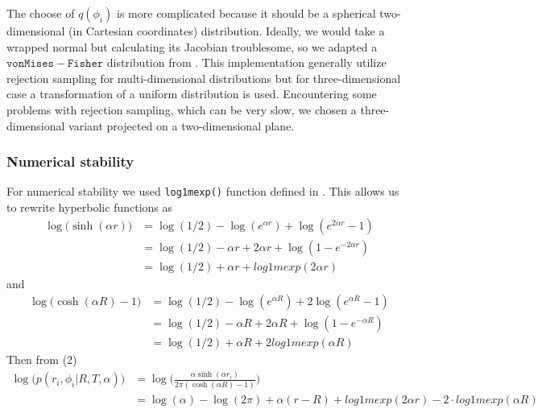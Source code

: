 \documentclass{article}
\begin{document}
The choose of $q(\phi_i)$ is more complicated because it should be a spherical two-dimensional (in Cartesian coordinates) distribution. Ideally, we would take a wrapped normal but calculating its Jacobian troublesome, so we adapted a $\mathtt{von Mises-Fisher}$ distribution from \cite{vmf}. This implementation generally utilize rejection sampling for multi-dimensional distributions but for three-dimensional case a transformation of a uniform distribution is used. Encountering some problems with rejection sampling, which can be very slow, we chosen a three-dimensional variant projected on a two-dimensional plane.\\

\subsubsection*{Numerical stability}
For numerical stability we used \verb|log1mexp()| function defined in \cite{log1mexp}. This allows us to rewrite hyperbolic functions as
\begin{equation}
\begin{split}
\log \big(\sinh(\alpha r)\big) &= \log(1/2) - \log(e^{\alpha r}) + \log(e^{2 \alpha r}-1)\\
&= \log(1/2) - \alpha r + 2 \alpha r + \log(1 - e^{-2 \alpha r})\\
&= \log(1/2) + \alpha r + log1mexp (2 \alpha r)
\end{split}
\end{equation} 
and
\begin{equation}
\begin{split}
\log \big(\cosh(\alpha R) -1\big) &= \log(1/2) - \log(e^{\alpha R}) + 2 \log(e^{\alpha R}-1)\\
&= \log(1/2) - \alpha R + 2 \alpha R + \log(1 - e^{-\alpha R})\\
&= \log(1/2) + \alpha R + 2 log1mexp (\alpha R)
\end{split}
\end{equation} 
Then from (2) 
\begin{equation}
\begin{split}
\log \big( p(r_i, \phi_i | R,T,\alpha) \big) &= \log \Biggl( \frac{\alpha \sinh (\alpha r_i)}{2 \pi (\cosh (\alpha R) -1)} \Biggr)\\
&= \log( \alpha ) - \log(2\pi) + \alpha (r-R) + log1mexp (2 \alpha r) - 2\cdot log1mexp (\alpha R)
\end{split}
\end{equation}
\end{document}
